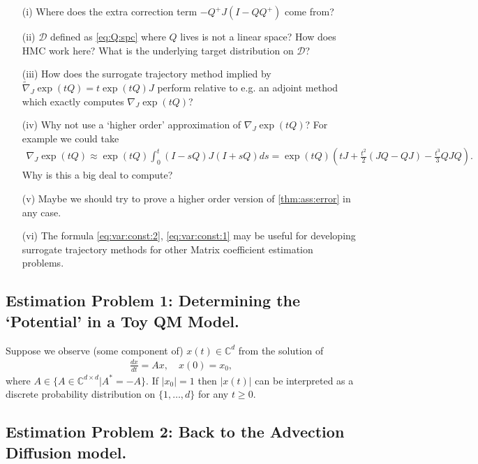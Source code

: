 \documentclass[twoside]{article}
\numberwithin{equation}{section}
\newcommand{\CC}{\mathbb{C}}
\begin{document}
\begin{itemize}
\item[(i)] Where does the extra correction term $-Q^+ J (I- Q Q^+)$ come from?
\item[(ii)] $\mathcal{D}$ defined as \eqref{eq:Q:spc} where $Q$ lives is not a linear space?  How does HMC work here?  What is the underlying target distribution on $\mathcal{D}$?
\item[(iii)] How does the surrogate trajectory method implied by $\tilde{\nabla}_J \exp(t Q) = t  \exp(t Q) J$ perform relative to 
e.g. an adjoint method which exactly computes $\nabla_J \exp(t Q)$?
\item[(iv)] Why not use a `higher order' approximation of $\nabla_J \exp(t Q)$?  For example we could take
\begin{align}
	\nabla_J \exp(t Q) \approx \exp(t Q) \int_0^t (I - sQ) J (I + sQ)ds = \exp(tQ) \left(tJ + \frac{t^2}{2} (JQ - QJ) -\frac{t^3}{3} QJ Q\right).
\end{align}
Why is this a big deal to compute?
\item[(v)] Maybe we should try to prove a higher order version of \eqref{thm:ass:error} in any case.
\item[(vi)] The formula \eqref{eq:var:const:2}, \eqref{eq:var:const:1} may be useful for developing surrogate trajectory methods for other Matrix coefficient estimation problems.
\end{itemize}

\subsection{Estimation Problem 1: Determining the `Potential' in a Toy QM Model.}

Suppose we observe (some component of) $x(t) \in \CC^d$ from the solution of
\begin{align}
	\frac{d x}{dt} = A x, \quad x(0) = x_0,
\end{align}
where $A \in \{ A \in \CC^{d\times d} | A^* = -A\}$.  If $|x_0| =1$ then $|x(t)|$  can be interpreted as a discrete probability distribution on $\{1, \ldots, d\}$ for any $t \geq 0$.

\subsection{Estimation Problem 2: Back to the Advection Diffusion model.} 
\end{document}
